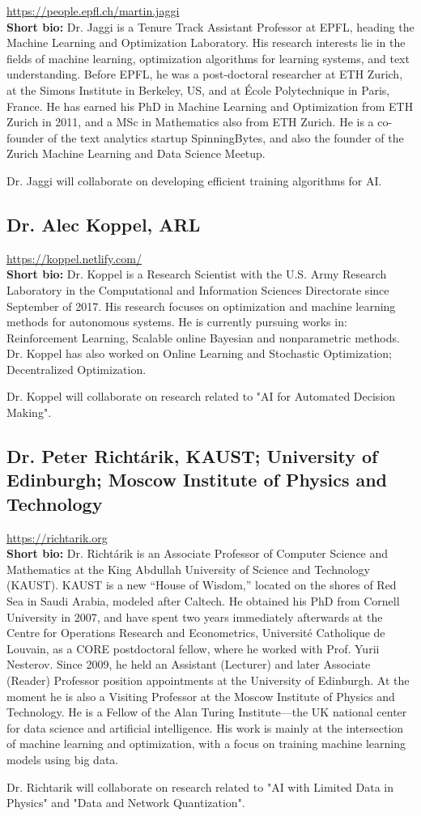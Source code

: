 \documentclass[11pt]{SelfArx}
\begin{document}
\url{https://people.epfl.ch/martin.jaggi}\\
{\bf Short bio:}
Dr. Jaggi is a Tenure Track Assistant Professor at EPFL, heading the Machine Learning and Optimization Laboratory. His research interests lie in the fields of machine learning, optimization algorithms for learning systems, and text understanding. Before EPFL, he was a post-doctoral researcher at ETH Zurich, at the Simons Institute in Berkeley, US, and at École Polytechnique in Paris, France. He has earned his PhD in Machine Learning and Optimization from ETH Zurich in 2011, and a MSc in Mathematics also from ETH Zurich. He is a co-founder of the text analytics startup SpinningBytes, and also the founder of the Zurich Machine Learning and Data Science Meetup.

Dr. Jaggi will collaborate on developing efficient training algorithms for AI.

\subsection*{Dr. Alec Koppel, ARL} 

\url{https://koppel.netlify.com/}\\
{\bf Short bio:}
Dr. Koppel is a  Research Scientist with the U.S. Army Research Laboratory in the Computational and Information Sciences Directorate since September of 2017. His research focuses on optimization and machine learning methods for autonomous systems. He is currently pursuing works in:
Reinforcement Learning, 
Scalable online Bayesian and nonparametric methods.
Dr. Koppel has also worked on Online Learning and Stochastic Optimization;
Decentralized Optimization.

Dr. Koppel will collaborate on research related to "AI for Automated
Decision Making".
 
\subsection*{Dr. Peter Richt\'arik, KAUST; University of Edinburgh; Moscow Institute of Physics and Technology}
\url{https://richtarik.org}\\
{\bf Short bio:}
Dr. Richt\'arik is an Associate Professor of Computer Science and
Mathematics at the King Abdullah University of Science and Technology (KAUST). KAUST
is a new ``House of Wisdom,'' located on the shores of Red Sea in Saudi Arabia, modeled
after Caltech. He obtained his PhD from Cornell University in 2007, and have spent two years
immediately afterwards at the Centre for Operations Research and Econometrics, Universit\'e
Catholique de Louvain, as a CORE postdoctoral fellow, where he worked with Prof. Yurii
Nesterov. Since 2009, he held an Assistant (Lecturer) and later Associate (Reader) Professor
position appointments at the University of Edinburgh. At the moment he is also a Visiting
Professor at the Moscow Institute of Physics and Technology. He is  a Fellow of the Alan
Turing Institute---the UK national center for data science and artificial intelligence. His
work is mainly at the intersection of machine learning and optimization, with a focus on
training machine learning models using big data.


Dr. Richtarik will collaborate on research related to "AI with Limited Data in Physics" and "Data and Network Quantization".
\end{document}
